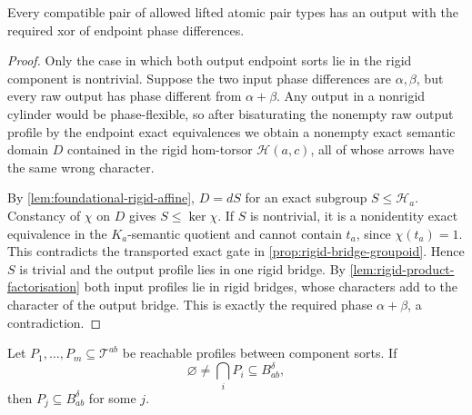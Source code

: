 \begin{lemma}
\label{lem:phase-totality}
Every compatible pair of allowed lifted atomic pair types has an output with
the required xor of endpoint phase differences.
\end{lemma}

\begin{proof}
Only the case in which both output endpoint sorts lie in the rigid component
is nontrivial.  Suppose the two input phase differences are $\alpha,\beta$,
but every raw output has phase different from $\alpha+\beta$.  Any output in
a nonrigid cylinder would be phase-flexible, so after bisaturating the
nonempty raw output profile by the endpoint exact equivalences we obtain a
nonempty exact semantic domain $D$ contained in the rigid hom-torsor
$\mathcal H(a,c)$, all of whose arrows have the same wrong character.

By \cref{lem:foundational-rigid-affine}, $D=dS$ for an exact subgroup
$S\le\mathcal H_a$.  Constancy of $\chi$ on $D$ gives
$S\le\ker\chi$.  If $S$ is nontrivial, it is a nonidentity exact equivalence
in the $K_a$-semantic quotient and cannot contain $t_a$, since
$\chi(t_a)=1$.  This contradicts the transported exact gate in
\cref{prop:rigid-bridge-groupoid}.  Hence $S$ is trivial and the output
profile lies in one rigid bridge.  By
\cref{lem:rigid-product-factorisation} both input profiles lie in rigid
bridges, whose characters add to the character of the output bridge.  This is
exactly the required phase $\alpha+\beta$, a contradiction.
\end{proof}

\begin{theorem}
\label{thm:typed-epp}
Let $P_1,\ldots,P_m\subseteq\mathcal T^{ab}$ be reachable profiles between
component sorts.  If
\[
 \varnothing\ne\bigcap_iP_i\subseteq B_{ab}^{\delta},
\tag{8}\label{eq:epp-hyp}
\]
then $P_j\subseteq B_{ab}^{\delta}$ for some $j$.
\end{theorem}

